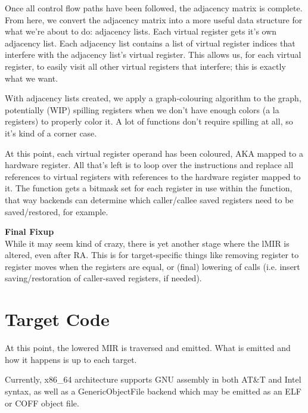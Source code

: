 \documentclass[12pt]{article}
\begin{document}
Once all control flow paths have been followed, the adjacency matrix is complete. From here, we convert the adjacency matrix into a more useful data structure for what we're about to do: adjacency lists. Each virtual register gets it's own adjacency list. Each adjacency list contains a list of virtual register indices that interfere with the adjacency list's virtual register. This allows us, for each virtual register, to easily visit all other virtual registers that interfere; this is exactly what we want.

With adjacency lists created, we apply a graph-colouring algorithm to the graph, potentially (WIP) spilling registers when we don't have enough colors (a la registers) to properly color it. A lot of functions don't require spilling at all, so it's kind of a corner case.

At this point, each virtual register operand has been coloured, AKA mapped to a hardware register. All that's left is to loop over the instructions and replace all references to virtual registers with references to the hardware register mapped to it. The function gets a bitmask set for each register in use within the function, that way backends can determine which caller/callee saved registers need to be saved/restored, for example.

\noindent\textbf{Final Fixup}\\
\indent While it may seem kind of crazy, there is yet another stage where the lMIR is altered, even after RA. This is for target-specific things like removing register to register moves when the registers are equal, or (final) lowering of calls (i.e. insert saving/restoration of caller-saved registers, if needed).

\section{Target Code}
\label{sec:target-code}

At this point, the lowered MIR is traversed and emitted. What is emitted and how it happens is up to each target.

Currently, x86\_64 architecture supports GNU assembly in both AT\&T and Intel syntax, as well as a GenericObjectFile backend which may be emitted as an ELF or COFF object file.
\end{document}
